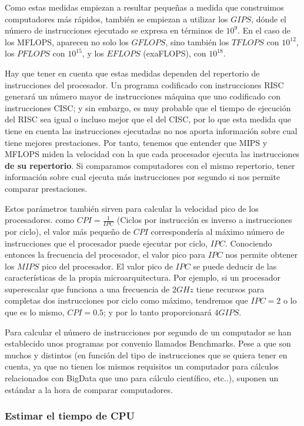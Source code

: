 \documentclass[a4paper, 11pt]{article}
\begin{document}
Como estas medidas empiezan a resultar pequeñas a medida que construimos computadores más rápidos, también se empiezan a utilizar los $GIPS$, dónde el número de instrucciones ejecutado se expresa en términos de $10^9$. En el caso de los MFLOPS, aparecen no solo los $GFLOPS$, sino también los $TFLOPS$ con $10^{12}$, los $PFLOPS$ con $10^{15}$, y los $EFLOPS$ (exaFLOPS), con $10^{18}$. 

Hay que tener en cuenta que estas medidas dependen del repertorio de instrucciones del procesador. Un programa codificado con instrucciones RISC generará un número mayor de instrucciones máquina que uno codificado con instrucciones CISC; y sin embargo, es muy probable que el tiempo de ejecución del RISC sea igual o incluso mejor que el del CISC, por lo que esta medida que tiene en cuenta las instrucciones ejecutadas no nos aporta información sobre cual tiene mejores prestaciones. Por tanto, tenemos que entender que MIPS y MFLOPS miden la velocidad con la que cada procesador ejecuta las instrucciones \textbf{de su repertorio}. Si comparamos computadores con el mismo repertorio, tener información sobre cual ejecuta más instrucciones por segundo si nos permite comparar prestaciones.

Estos parámetros también sirven para calcular la velocidad pico de los procesadores. como $CPI = \frac{1}{IPC}$ (Ciclos por instrucción es inverso a instrucciones por ciclo), el valor más pequeño de $CPI$ correspondería al máximo número de instrucciones que el procesador puede ejecutar por ciclo, $IPC$. Conociendo entonces la frecuencia del procesador, el valor pico para $IPC$ nos permite obtener los $MIPS$ pico del procesador.
El valor pico de $IPC$ se puede deducir de las características de la propia microarquitectura. Por ejemplo, si un procesador superescalar que funciona a una frecuencia de $2 GHz$ tiene recursos para completas dos instrucciones por ciclo como máximo, tendremos que $IPC = 2$ o lo que es lo mismo, $CPI = 0.5$; y por lo tanto proporcionará $4GIPS$.

Para calcular el número de instrucciones por segundo de un computador se han establecido unos programas por convenio llamados Benchmarks. Pese a que son muchos y distintos (en función del tipo de instrucciones que se quiera tener en cuenta, ya que no tienen los mismos requisitos un computador para cálculos relacionados con BigData que uno para cálculo científico, etc..), suponen un estándar a la hora de comparar computadores. 

\subsubsection{Estimar el tiempo de CPU}
\end{document}
